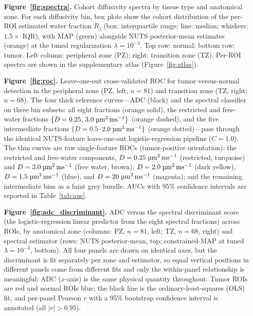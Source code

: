 \medskip\noindent\textbf{Figure~\ref{fig:spectra}.}
Cohort diffusivity spectra by tissue type and anatomical zone.
For each diffusivity bin, box plots show the cohort distribution of the per-ROI
estimated water fraction $R_j$ (box: interquartile range; line: median;
whiskers: $1.5\times$ IQR), with MAP (green) alongside NUTS posterior-mean
estimates (orange) at the tuned regularization $\lambda = 10^{-3}$.
Top row: normal; bottom row: tumor. Left column: peripheral zone (PZ); right:
transition zone (TZ). Per-ROI spectra are shown in the supplementary atlas
(Figure~\ref{fig:atlas}).

\medskip\noindent\textbf{Figure~\ref{fig:roc}.}
Leave-one-out cross-validated ROC for tumor-versus-normal detection in the
peripheral zone (PZ, left; $n = 81$) and transition zone (TZ, right; $n = 68$).
The four thick reference curves---ADC (black) and the spectral classifier on
three bin subsets: all eight fractions (orange solid), the restricted and free-water fractions
$\{D = 0.25,\,3.0\;\si{\micro\meter\squared\per\milli\second}\}$ (orange dashed), and the five intermediate fractions
$\{D = 0.5$--$2.0\;\si{\micro\meter\squared\per\milli\second}\}$ (orange dotted)---pass through the identical
NUTS-feature leave-one-out logistic-regression pipeline ($C = 1.0$).
The thin curves are raw single-feature ROCs (tumor-positive orientation): the
restricted and free-water components, $D = 0.25\;\si{\micro\meter\squared\per\milli\second}$ (restricted, turquoise) and $D = 3.0\;\si{\micro\meter\squared\per\milli\second}$
(free water, brown); $D = 2.0\;\si{\micro\meter\squared\per\milli\second}$ (dark yellow), $D = 1.5\;\si{\micro\meter\squared\per\milli\second}$ (blue),
and $D = 20\;\si{\micro\meter\squared\per\milli\second}$ (magenta); and the remaining intermediate bins as a faint
grey bundle.
AUCs with 95\% confidence intervals are reported in Table~\ref{tab:auc}.

\medskip\noindent\textbf{Figure~\ref{fig:adc_discriminant}.}
ADC versus the spectral discriminant score (the logistic-regression linear
predictor from the eight spectral fractions) across ROIs, by anatomical zone
(columns: PZ, $n = 81$, left; TZ, $n = 68$, right) and spectral estimator
(rows: NUTS posterior-mean, top; constrained-MAP at tuned $\lambda = 10^{-3}$,
bottom).
All four panels are drawn on identical axes, but the discriminant is fit
separately per zone and estimator, so equal vertical positions in different
panels come from different fits and only the within-panel relationship is
meaningful; ADC ($x$-axis) is the same physical quantity throughout.
Tumor ROIs are red and normal ROIs blue; the black line is the
ordinary-least-squares (OLS) fit, and per-panel Pearson $r$ with a 95\% bootstrap
confidence interval is annotated (all $|r| > 0.95$).

